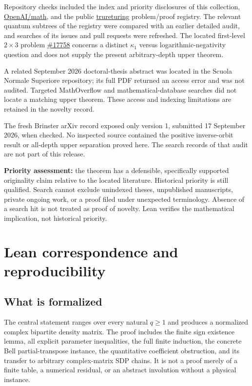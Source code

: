 \documentclass[11pt]{article}
\begin{document}
Repository checks included the index and priority disclosures of this
collection,
\href{https://github.com/OpenAI/math}{OpenAI/math}, and the public
\href{https://github.com/the-omega-institute/trureturing}{trureturing}
problem/proof registry. The relevant quantum subtrees of the registry were
compared with an earlier detailed audit, and searches of its issues and pull
requests were refreshed. The located first-level $2\times3$ problem
\href{https://github.com/the-omega-institute/trureturing/issues/17758}{\#17758}
concerns a distinct $\kappa_1$ versus logarithmic-negativity question and
does not supply the present arbitrary-depth upper theorem.

A related September 2026 doctoral-thesis abstract was located in the Scuola
Normale Superiore repository; its full PDF returned an access error and was
not audited. Targeted MathOverflow and mathematical-database searches did
not locate a matching upper theorem. These access and indexing limitations
are retained in the novelty record.

The fresh Brinster arXiv record exposed only version 1, submitted
17 September 2026, when checked. No inspected source contained the
positive inverse-orbit result or all-depth upper separation proved here.
The search records of that audit are not part of this release.

\textbf{Priority assessment:} the theorem has a defensible, specifically
supported originality claim relative to the located literature. Historical
priority is still qualified. Search cannot exclude unindexed theses,
unpublished manuscripts, private ongoing work, or a proof filed under
unexpected terminology. Absence of a search hit is not treated as proof of
novelty. Lean verifies the mathematical implication, not historical priority.

\section{Lean correspondence and reproducibility}\label{sec:lean}
\subsection{What is formalized}
The central statement ranges over every natural $q\ge1$ and produces a
normalized complex bipartite density matrix. The proof includes the finite
sign existence lemma, all explicit parameter inequalities, the full finite
induction, the concrete Bell partial-transpose instance, the quantitative
coefficient obstruction, and its transfer to arbitrary complex-matrix SDP
chains. It is not a proof merely of a finite table, a numerical residual,
or an abstract involution without a physical instance.
\end{document}
